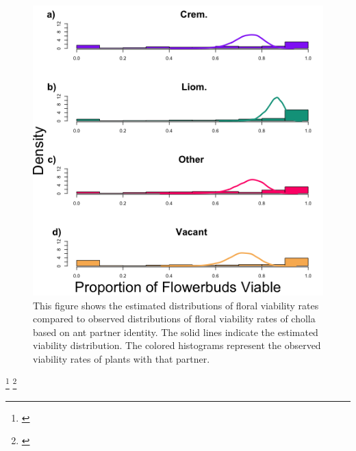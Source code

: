 \documentclass[11pt]{article}
\newcommand{\tom}[2]{{\color{red}{#1}}\footnote{\textit{\color{red}{#2}}}}
\newcommand{\ali}[2]{{\color{blue}{#1}}\footnote{\textit{\color{blue}{#2}}}}
\begin{document}
\begin{figure}[H]
	\includegraphics[width=0.95\linewidth]{Figures/ViabHist.png}
	\caption{This figure shows the estimated distributions of floral viability rates compared to observed distributions of floral viability rates of cholla based on ant partner identity. The solid lines indicate the estimated viability distribution. The colored histograms represent the observed viability rates of plants with that partner. }
	\label{fig:Viab}
\end{figure}

\ali{}{Should I include other model results here or just indicate that the rest are reported in an appendix/supplementary materials?}
\tom{}{I think you can include a short paragraph that briefly mentions that other vital rates are in the appendix.}
\end{document}
